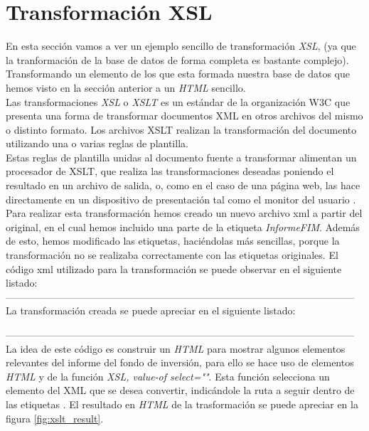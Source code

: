 \documentclass[11pt]{diazessay} %
\begin{document}
\newpage
\section*{Transformación XSL}
En esta sección vamos a ver un ejemplo sencillo de transformación \textit{XSL}, (ya que la tranformación de la base de datos de forma completa es bastante complejo).\\ Transformando un elemento de los que esta formada nuestra base de datos que hemos visto en la sección anterior a un \textit{HTML} sencillo. \\

Las transformaciones \textit{XSL} o \textit{XSLT} es un estándar de la organización W3C que presenta una forma de transformar documentos XML en otros archivos del mismo o distinto formato. Los archivos XSLT realizan la transformación del documento utilizando una o varias reglas de plantilla.\\

Estas reglas de plantilla unidas al documento fuente a transformar alimentan un procesador de XSLT, que realiza las transformaciones deseadas poniendo el resultado en un archivo de salida, o, como en el caso de una página web, las hace directamente en un dispositivo de presentación tal como el monitor del usuario \cite{xslt}.\\

Para realizar esta transformación hemos creado un nuevo archivo xml a partir del original, en el cual hemos incluido una parte de la etiqueta \textit{InformeFIM}. Además de esto, hemos modificado las etiquetas, haciéndolas más sencillas, porque la transformación no se realizaba correctamente con las etiquetas originales. El código xml utilizado para la transformación se puede observar en el siguiente listado:\\

 
---------------------------------------------------------------------------------------------------------\\

La transformación  creada se puede apreciar en el siguiente listado:
 
---------------------------------------------------------------------------------------------------------\\

La idea de este código es construir un \textit{HTML} para mostrar algunos elementos relevantes del informe del fondo de inversión, para ello se hace uso de elementos \textit{HTML} y de la función \textit{XSL, value-of select=""}. Esta función selecciona un elemento del XML que se desea convertir, indicándole la ruta a seguir dentro de las etiquetas \cite{xsl_valueof}. El resultado en \textit{HTML} de la trasformación se puede apreciar en la figura \ref{fig:xslt_result}.\\
\end{document}
